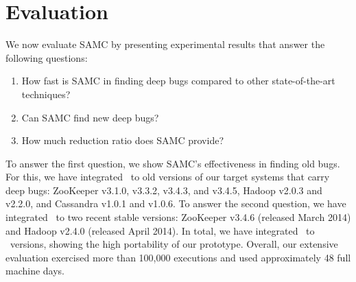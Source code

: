 
\section{Evaluation}
\label{sec-eval}

We now evaluate SAMC by presenting experimental results that answer the
following questions: 
\begin{enumerate}
\item How fast is SAMC in finding deep bugs compared to other state-of-the-art techniques?  
\item Can SAMC find new deep bugs?  
\item How much reduction ratio does SAMC provide?
\end{enumerate}

To answer the first question, we show SAMC's effectiveness in finding old
bugs.  For this, we have integrated \sampro\ to old versions of our target
systems that carry deep bugs: ZooKeeper v3.1.0, v3.3.2, v3.4.3, and v3.4.5,
Hadoop v2.0.3 and v2.2.0, and Cassandra v1.0.1 and v1.0.6.  To answer the
second question, we have integrated \sampro\ to two recent stable versions:
ZooKeeper v3.4.6 (released March 2014) and Hadoop v2.4.0 (released April
2014).  In total, we have integrated \sampro\ to \numVersions\ versions,
showing the high portability of our prototype.  Overall, our extensive
evaluation exercised more than 100,000 executions and used approximately 48
full machine days.




